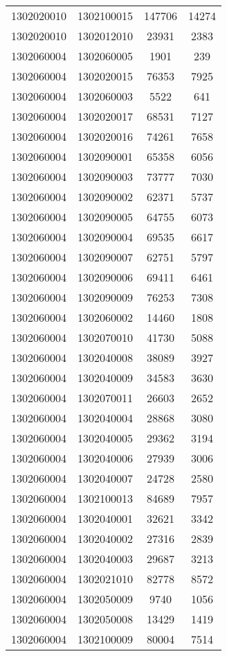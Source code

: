 \begin{longtable}[h]{llcc}
		1302020010 & 1302100015 & 147706 & 14274\\
		1302020010 & 1302012010 & 23931 & 2383\\
		1302060004 & 1302060005 & 1901 & 239\\
		1302060004 & 1302020015 & 76353 & 7925\\
		1302060004 & 1302060003 & 5522 & 641\\
		1302060004 & 1302020017 & 68531 & 7127\\
		1302060004 & 1302020016 & 74261 & 7658\\
		1302060004 & 1302090001 & 65358 & 6056\\
		1302060004 & 1302090003 & 73777 & 7030\\
		1302060004 & 1302090002 & 62371 & 5737\\
		1302060004 & 1302090005 & 64755 & 6073\\
		1302060004 & 1302090004 & 69535 & 6617\\
		1302060004 & 1302090007 & 62751 & 5797\\
		1302060004 & 1302090006 & 69411 & 6461\\
		1302060004 & 1302090009 & 76253 & 7308\\
		1302060004 & 1302060002 & 14460 & 1808\\
		1302060004 & 1302070010 & 41730 & 5088\\
		1302060004 & 1302040008 & 38089 & 3927\\
		1302060004 & 1302040009 & 34583 & 3630\\
		1302060004 & 1302070011 & 26603 & 2652\\
		1302060004 & 1302040004 & 28868 & 3080\\
		1302060004 & 1302040005 & 29362 & 3194\\
		1302060004 & 1302040006 & 27939 & 3006\\
		1302060004 & 1302040007 & 24728 & 2580\\
		1302060004 & 1302100013 & 84689 & 7957\\
		1302060004 & 1302040001 & 32621 & 3342\\
		1302060004 & 1302040002 & 27316 & 2839\\
		1302060004 & 1302040003 & 29687 & 3213\\
		1302060004 & 1302021010 & 82778 & 8572\\
		1302060004 & 1302050009 & 9740 & 1056\\
		1302060004 & 1302050008 & 13429 & 1419\\
		1302060004 & 1302100009 & 80004 & 7514\\

\end{longtable}

